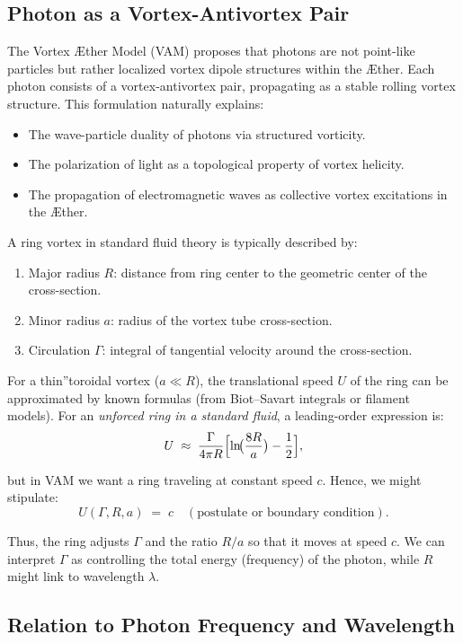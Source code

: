 \documentclass[a4paper,12pt]{article}
\begin{document}
\subsection{Photon as a Vortex-Antivortex Pair}
The Vortex Æther Model (VAM) proposes that photons are not point-like particles but rather localized vortex dipole structures within the Æther. Each photon consists of a vortex-antivortex pair, propagating as a stable rolling vortex structure. This formulation naturally explains:
\begin{itemize}
    \item The wave-particle duality of photons via structured vorticity.
    \item The polarization of light as a topological property of vortex helicity.
    \item The propagation of electromagnetic waves as collective vortex excitations in the Æther.
\end{itemize}

A ring vortex in standard fluid theory is typically described by:
\begin{enumerate}
    \item Major radius $R$: distance from ring center to the geometric center of the cross-section.
    \item Minor radius $a$: radius of the vortex tube cross-section.
    \item Circulation $\Gamma$: integral of tangential velocity around the cross-section.
\end{enumerate}

For a \grqq thin\textquotedblright toroidal vortex ($ a \ll R$), the translational speed $U$ of the ring can be approximated by known formulas (from Biot–Savart integrals or filament models). For an \textit{unforced ring in a standard fluid}, a leading-order expression is:
$$ U
\;\approx\;
\frac{\Gamma}{4\pi R}
\Bigl[\ln\!\bigl(\frac{8R}{a}\bigr) - \frac{1}{2}\Bigr], $$

but in VAM we want a ring traveling at constant speed $c$. Hence, we might stipulate:
$$ U(\Gamma, R, a)
\;=\;
c
\quad
(\text{postulate or boundary condition}). $$

Thus, the ring adjusts $\Gamma$ and the ratio $R/a$ so that it moves at speed $c$. We can interpret $\Gamma$ as controlling the total energy (frequency) of the photon, while $R$ might link to wavelength $\lambda$.

\subsection{Relation to Photon Frequency and Wavelength}
\end{document}
